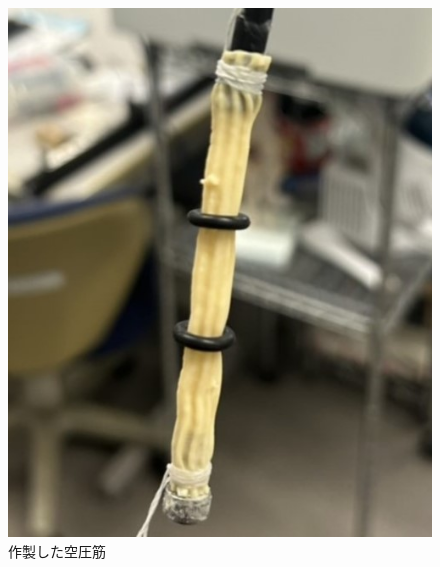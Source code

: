 \begin{figure}[!h]
  \centering  %
  \includegraphics[scale=0.3]{pic/ww.jpg}
  \caption{作製した空圧筋}
  \label{fig:17}
\end{figure}
\newpage

